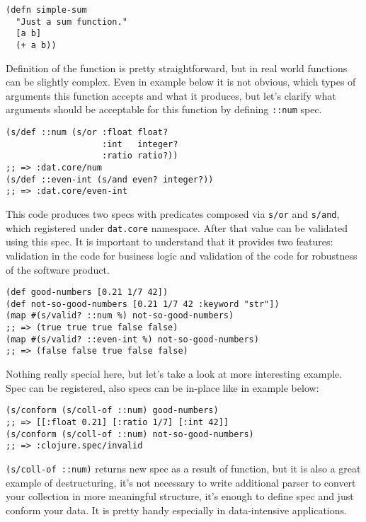 \begin{verbatim}
(defn simple-sum
  "Just a sum function."
  [a b]
  (+ a b))
\end{verbatim}

Definition of the function is pretty straightforward, but in real world
functions can be slightly complex. Even in example below it is not obvious,
which types of arguments this function accepts and what it produces, but let's
clarify what arguments should be acceptable for this function by defining
\texttt{::num} spec.


\begin{verbatim}
(s/def ::num (s/or :float float?
                   :int   integer?
                   :ratio ratio?))
;; => :dat.core/num
(s/def ::even-int (s/and even? integer?))
;; => :dat.core/even-int
\end{verbatim}

This code produces two specs with predicates composed via \texttt{s/or} and
\texttt{s/and}, which registered under \texttt{dat.core} namespace. After that
value can be validated using this spec. It is important to understand that it
provides two features: validation in the code for business logic and validation
of the code for robustness of the software product.

\begin{verbatim}
(def good-numbers [0.21 1/7 42])
(def not-so-good-numbers [0.21 1/7 42 :keyword "str"])
(map #(s/valid? ::num %) not-so-good-numbers)
;; => (true true true false false)
(map #(s/valid? ::even-int %) not-so-good-numbers)
;; => (false false true false false)
\end{verbatim}

Nothing really special here, but let's take a look at more interesting example.
Spec can be registered, also specs can be in-place like in example below:

\begin{verbatim}
(s/conform (s/coll-of ::num) good-numbers)
;; => [[:float 0.21] [:ratio 1/7] [:int 42]]
(s/conform (s/coll-of ::num) not-so-good-numbers)
;; => :clojure.spec/invalid
\end{verbatim}

\texttt{(s/coll-of ::num)} returns new spec as a result of function, but it is
also a great example of destructuring, it's not necessary to write additional
parser to convert your collection in more meaningful structure, it's enough to
define spec and just conform your data. It is pretty handy especially in
data-intensive applications.

